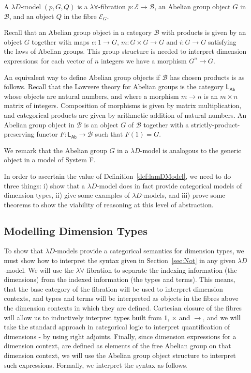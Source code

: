 \documentclass[a4paper,UKenglish]{lipics}
\newcommand{\SystemF}{System F\xspace}
\newcommand{\msf}[1]{\mathsf{#1}} %
\newcommand{\LAb}{\msf{L}_{\msf{Ab}}}
\newcommand{\B}{\mathcal{B}}
\newcommand{\E}{\mathcal{E}}
\newcommand{\fibreE}[1]{\E_{#1}}
\newcommand{\unitTy}{\msf{1}}
\begin{document}
\begin{definition}\label{def:lamDModel}
A $\lambda D$-model $(p,G, Q)$ is a $\lambda \forall$-fibration $p:\E\to \B$, an Abelian group object $G$ in $\B$, and an object $Q$ in the fibre $\fibreE{G}$.
\end{definition}

Recall that an Abelian group object in a category $\B$ with products is given by an object $G$ together with maps $e:1\to G$, $m:G\times G\to G$ and $i:G\to G$ satisfying the laws of Abelian groups. This group structure is needed to interpret dimension expressions: for each vector of $n$ integers we have a morphism $G^n\to G$.

An equivalent way to define Abelian group objects if $\B$ has chosen products is as follows. Recall that the Lawvere theory for Abelian groups is the category $\LAb$ whose objects are natural numbers, and where a morphism $m\to n$ is an $m\times n$ matrix of integers. Composition of morphisms is given by matrix multiplication, and categorical products are given by arithmetic addition of natural numbers. An Abelian group object in $\B$ is an object $G$ of $\B$ together with a strictly-product-preserving functor $F:\LAb\to\B$ such that $F(1)=G$.

We remark that the Abelian group $G$ in a $\lambda D$-model is analogous to the generic object in a model of \SystemF.

In order to ascertain the value of Definition~\ref{def:lamDModel}, we need to do three things: i) show that a $\lambda D$-model does in fact provide categorical models of dimension types, ii) give some examples of $\lambda D$-models, and iii) prove some theorems to show the viability of reasoning at this level of abstraction.





\subsection{Modelling Dimension Types}
To show that $\lambda D$-models provide a categorical semantics for dimension types, we must show how to interpret the syntax given in Section~\ref{sec:Not} in any given $\lambda D$-model. We will use the $\lambda \forall$-fibration to separate the indexing information (the dimensions) from the indexed information (the types and terms). This means, that the base category of the fibration will be used to interpret dimension contexts, and types and terms will be interpreted as objects in the fibres above the dimension contexts in which they are defined. Cartesian closure of the fibres will allow us to inductively interpret types built from $\unitTy$, $\times$ and $\rightarrow$, and we will take the standard approach in categorical logic to interpret quantification of dimensions - by using right adjoints. Finally, since dimension expressions for a dimension context, are defined as elements of the free Abelian group on that dimension context, we will use the Abelian group object structure to interpret
such expressions. Formally, we interpret the syntax as follows.
\end{document}
